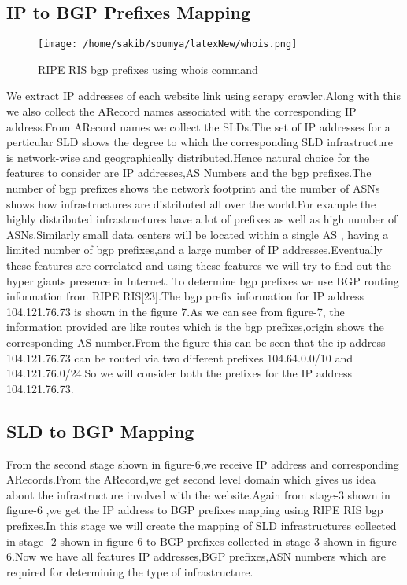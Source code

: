 \subsection{IP to BGP Prefixes Mapping}

\begin{figure}[h]
\texttt{[image: /home/sakib/soumya/latexNew/whois.png]}
\centering
\caption{RIPE RIS bgp prefixes using whois command}
\end{figure}

We extract IP addresses of each website link using scrapy crawler.Along with
this we also collect the ARecord names associated with the corresponding IP
address.From ARecord names we collect the SLDs.The set of IP addresses for a
perticular SLD shows the degree to which the corresponding SLD infrastructure
is network-wise and geographically distributed.Hence natural choice for the features to consider are IP addresses,AS Numbers and the bgp prefixes.The number
of bgp prefixes shows the network footprint and the number of ASNs shows how
infrastructures are distributed all over the world.For example the highly distributed
infrastructures have a lot of prefixes as well as high number of ASNs.Similarly
small data centers will be located within a single AS , having a limited number of bgp prefixes,and a large number of IP addresses.Eventually these features are correlated and using these features we will try to find out the hyper giants presence in Internet.
To determine bgp prefixes we use BGP routing information from RIPE RIS[23].The bgp prefix information for IP address 104.121.76.73 is shown in the
figure 7.As we can see from figure-7, the information provided are like routes
which is the bgp prefixes,origin shows the corresponding AS number.From the
figure this can be seen that the ip address 104.121.76.73 can be routed via two
different prefixes 104.64.0.0/10 and 104.121.76.0/24.So we will consider both the
prefixes for the IP address 104.121.76.73.
\subsection{SLD to BGP Mapping}
From the second stage shown in figure-6,we receive IP address and corresponding
ARecords.From the ARecord,we get second level domain which gives us idea
about the infrastructure involved with the website.Again from stage-3 shown in figure-6 ,we get
the IP address to BGP prefixes mapping using RIPE RIS bgp prefixes.In this stage we will
create the mapping of SLD infrastructures collected in stage -2 shown in figure-6 to BGP prefixes
collected in stage-3 shown in figure-6.Now we have all features IP addresses,BGP prefixes,ASN
numbers which are required for determining the type of infrastructure.
